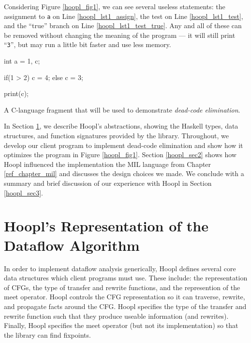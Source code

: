 \documentclass[12pt]{report}
\begin{document}
Considering Figure \ref{hoopl_fig1}, we can see several
useless statements: the assignment to \texttt{a} on Line
\ref{hoopl_lst1_assign}, the test on Line \ref{hoopl_lst1_test}, and
the ``true'' branch on Line \ref{hoopl_lst1_test_true}. Any and all of
these can be removed without changing the meaning of the program ---
it will still print ``\texttt{3}'', but may run a little bit faster
and use less memory. 

\begin{myfig}
\begin{minipage}[b]{2in}
\begin{AVerb}[numbers=left]
int a = 1, c; \label{hoopl_lst1_assign}

if(1 > 2) \label{hoopl_lst1_test}
  c = 4; \label{hoopl_lst1_test_true}
else     
  c = 3; \label{hoopl_lst1_test_false}

print(c); \label{hoopl_lst1_print}
\end{AVerb}
\end{minipage}
\caption{A C-language fragment that will be used to demonstrate
  \emph{dead-code elimination}.}
\label{hoopl_fig1}
\end{myfig}


In Section \ref{hoopl_sec1}, we describe Hoopl's abstractions, showing
the Haskell types, data structures, and function signatures provided
by the library. Throughout, we develop our client program to implement
dead-code elimination and show how it optimizes the program in Figure
\ref{hoopl_fig1}. Section \ref{hoopl_sec2} shows how Hoopl influenced
the implementation the MIL language from Chapter \ref{ref_chapter_mil}
and discusses the design choices we made. We conclude with a summary
and brief discussion of our experience with Hoopl in Section
\ref{hoopl_sec3}.

\section{Hoopl's Representation of the Dataflow Algorithm}
\label{hoopl_sec1}


In order to implement dataflow analysis generically, Hoopl defines
several core data structures which client programs must use. These
include: the representation of CFGs, the type of transfer and rewrite
functions, and the represention of the meet operator. Hoopl controls
the CFG representation so it can traverse, rewrite, and propagate
facts around the CFG. Hoopl specifies the type of the transfer and
rewrite function such that they produce useable information (and
rewrites). Finally, Hoopl specifies the meet operator (but not its
implementation) so that the library can find fixpoints.
\end{document}
